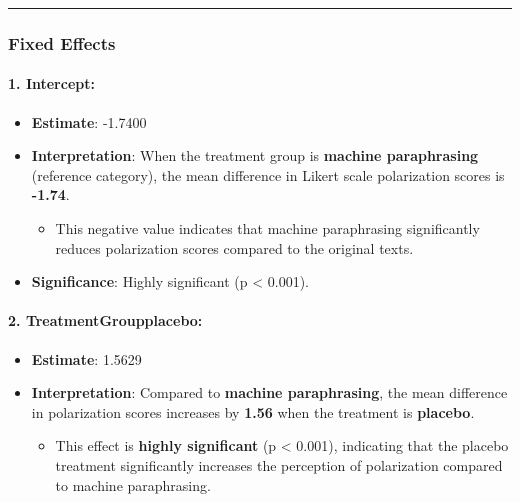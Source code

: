\documentclass[
]{article}
\providecommand{\tightlist}{%
  \setlength{\itemsep}{0pt}\setlength{\parskip}{0pt}}
\begin{document}
\begin{center}\rule{0.5\linewidth}{0.5pt}\end{center}

\subsubsection{\texorpdfstring{\textbf{Fixed
Effects}}{Fixed Effects}}\label{fixed-effects-2}

\paragraph{\texorpdfstring{\textbf{1.
Intercept:}}{1. Intercept:}}\label{intercept-2}

\begin{itemize}
\tightlist
\item
  \textbf{Estimate}: -1.7400
\item
  \textbf{Interpretation}: When the treatment group is \textbf{machine
  paraphrasing} (reference category), the mean difference in Likert
  scale polarization scores is \textbf{-1.74}.

  \begin{itemize}
  \tightlist
  \item
    This negative value indicates that machine paraphrasing
    significantly reduces polarization scores compared to the original
    texts.
  \end{itemize}
\item
  \textbf{Significance}: Highly significant (p \textless{} 0.001).
\end{itemize}

\paragraph{\texorpdfstring{\textbf{2.
TreatmentGroupplacebo:}}{2. TreatmentGroupplacebo:}}\label{treatmentgroupplacebo-2}

\begin{itemize}
\tightlist
\item
  \textbf{Estimate}: 1.5629
\item
  \textbf{Interpretation}: Compared to \textbf{machine paraphrasing},
  the mean difference in polarization scores increases by \textbf{1.56}
  when the treatment is \textbf{placebo}.

  \begin{itemize}
  \tightlist
  \item
    This effect is \textbf{highly significant} (p \textless{} 0.001),
    indicating that the placebo treatment significantly increases the
    perception of polarization compared to machine paraphrasing.
  \end{itemize}
\end{itemize}
\end{document}
